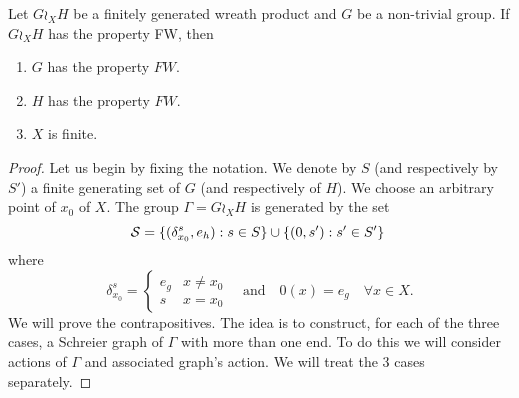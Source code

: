 \begin{lem}\label{Lem:Wreath_groups_ends}
Let $G \wr_X H$ be a finitely generated wreath product and $G$ be a non-trivial group. If $G \wr_X H$ has the property FW, then 
\begin{enumerate}
\item $G$ has the property $FW$.
\item $H$ has the property $FW$.
\item $X$ is finite.
\end{enumerate}
%
\begin{proof} 
Let us begin by fixing the notation. We denote by $S$ (and respectively by $S'$) a finite generating set of $G$ (and respectively of $H$). We choose an arbitrary point of $x_0$ of $X$. The group $\Gamma = G \wr_X H $ is generated by the set 
\begin{equation*}
\S = \{(\delta_{x_0}^s, e_h) : s \in S \} \cup \{ (0, s') : s' \in S' \} 
\end{equation*}
where 
\begin{equation*}
\delta_{x_0}^s = \begin{cases} e_g & x \neq x_0 \\ s 	& x = x_0 \end{cases} \quad \text{and}\quad 0(x) = e_g \quad \forall x \in X.
\end{equation*}
We will prove the contrapositives. The idea is to construct, for each of the three cases, a Schreier graph of $\Gamma$ with more than one end. To do this we will consider actions of $\Gamma$ and associated graph's action. We will treat the 3 cases separately.


\end{proof}
\end{lem}
